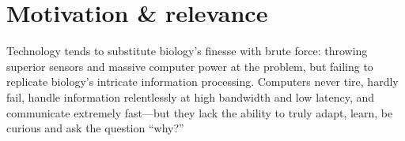 %
%


%
%

\section{Motivation \& relevance}

Technology tends to substitute biology's finesse with brute force: throwing superior sensors and massive computer power at the problem, but failing to replicate biology's intricate information processing. Computers never tire, hardly fail, handle information relentlessly at high bandwidth and low latency, and communicate extremely fast---but they lack the ability to truly adapt, learn, be curious and ask the question ``why?''

